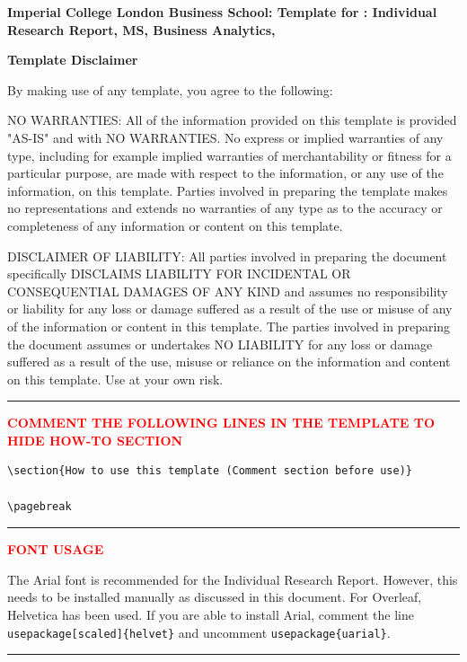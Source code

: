 
\textbf{Imperial College London Business School: Template for : Individual Research Report, MS, Business Analytics, 
}

\textbf{Template Disclaimer}

By making use of any template, you agree to the following:

NO WARRANTIES: All of the information provided on this template is provided "AS-IS" and with NO WARRANTIES. No express or implied warranties of any type, including for example implied warranties of merchantability or fitness for a particular purpose, are made with respect to the information, or any use of the information, on this template. Parties involved in preparing the template makes no representations and extends no warranties of any type as to the accuracy or completeness of any information or content on this template.


DISCLAIMER OF LIABILITY: All parties involved in preparing the document specifically DISCLAIMS LIABILITY FOR INCIDENTAL OR CONSEQUENTIAL DAMAGES OF ANY KIND and assumes no responsibility or liability for any loss or damage suffered as a result of the use or misuse of any of the information or content in this template. The parties involved in preparing the document assumes or undertakes NO LIABILITY for any loss or damage suffered as a result of the use, misuse or reliance on the information and content on this template. Use at your own risk.

{\color{red} \rule{\linewidth}{0.5mm} }
\textcolor{red}{\textbf{COMMENT THE FOLLOWING LINES IN THE TEMPLATE TO HIDE HOW-TO SECTION}}
\begin{verbatim}
\section{How to use this template (Comment section before use)}

\pagebreak
\end{verbatim}
{\color{red} \rule{\linewidth}{0.5mm}}

\textcolor{red}{\textbf{FONT USAGE}}

The Arial font is recommended for the Individual Research Report. However, this needs to be installed manually as discussed in this document. For Overleaf, Helvetica has been used. If you are able to install Arial, comment the line \texttt{usepackage[scaled]\{helvet\}} and uncomment \texttt{usepackage\{uarial\}}.

{\color{red} \rule{\linewidth}{0.5mm}}

